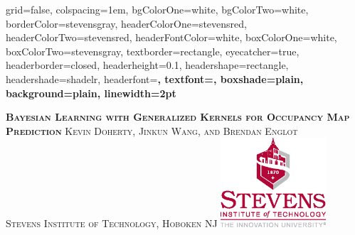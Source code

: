 \documentclass[portrait,final,archD,fontscale=0.477]{baposter}
\begin{document}


\begin{poster}%
  {
  grid=false,
  colspacing=1em,
  bgColorOne=white,
  bgColorTwo=white,
  borderColor=stevensgray,
  headerColorOne=stevensred,
  headerColorTwo=stevensred,
  headerFontColor=white,
  boxColorOne=white,
  boxColorTwo=stevensgray,
  textborder=rectangle,
  eyecatcher=true,
  headerborder=closed,
  headerheight=0.1\textheight,
  headershape=rectangle,
  headershade=shadelr,
  headerfont=\Large\bf\textsc, %
  textfont={\setlength{\parindent}{1.5em}},
  boxshade=plain,
  background=plain,
  linewidth=2pt
  }
  {\begin{minipage}{8em}
   \hfill\vspace{1in}
  \end{minipage} } %
  {\bf \textsc{  Bayesian Learning with Generalized Kernels for Occupancy Map Prediction} }
  {\textsc{  Kevin Doherty, Jinkun Wang, and Brendan Englot \\ Stevens Institute of Technology, Hoboken NJ}}
  {%
    \includegraphics[height=9.0em]{img/stevenslogo}
  }

    \newcommand{\colouredcircle}{%
      \tikz{\useasboundingbox (-0.2em,-0.32em) rectangle(0.2em,0.32em); \draw[draw=black,fill=lightblue,line width=0.03em] (0,0) circle(0.18em);}}


\end{poster}
\end{document}
